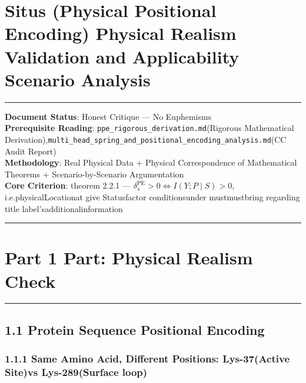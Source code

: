 \documentclass[
  12pt,
]{article}
\author{SCX}
\date{2026}
\begin{document}
\section{Situs (Physical Positional Encoding)
Physical Realism Validation and Applicability Scenario Analysis}\label{situs-physical-positional-encoding-ux7269ux7406ux771fux5b9eux6027ux9a8cux8bc1ux4e0eux9002ux7528ux573aux666fux5206ux6790}

\begin{center}\rule{0.5\linewidth}{0.5pt}\end{center}

\textbf{Document Status}: Honest Critique --- No Euphemisms\\
\textbf{Prerequisite Reading}:
\texttt{ppe\_rigorous\_derivation.md}(Rigorous Mathematical Derivation),\texttt{multi\_head\_spring\_and\_positional\_encoding\_analysis.md}(CC
Audit Report)\\
\textbf{Methodology}: Real Physical Data + Physical Correspondence of Mathematical Theorems + Scenario-by-Scenario Argumentation\\
\textbf{Core Criterion}: theorem  2.2.1 ---
\(\delta_s^{\text{PE}} > 0 \iff I(Y; P \mid S) > 0\), i.e.physicalLocationat give Statusfactor conditionsunder mustmustbring regarding title label'sadditionalinformation

\begin{center}\rule{0.5\linewidth}{0.5pt}\end{center}

\section{Part 1
Part: Physical Realism Check}\label{ux7b2c-1-ux90e8ux5206ux7269ux7406ux771fux5b9eux6027ux68c0ux67e5}

\begin{center}\rule{0.5\linewidth}{0.5pt}\end{center}

\subsection{1.1
Protein Sequence Positional Encoding }\label{ux86cbux767dux8d28ux5e8fux5217ux4f4dux7f6eux7f16ux7801}

\subsubsection{1.1.1 Same Amino Acid, Different Positions: Lys-37(Active Site)vs
Lys-289(Surface
loop)}\label{ux76f8ux540cux6c28ux57faux9178ux4e0dux540cux4f4dux7f6elys-37ux6d3bux6027ux4f4dux70b9vs-lys-289ux8868ux9762-loop}
\end{document}
